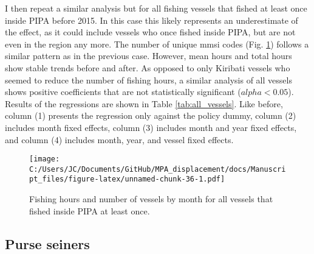 \documentclass[]{article}
\theoremstyle{definition}
\theoremstyle{definition}
\theoremstyle{definition}
\theoremstyle{remark}
\begin{document}
\clearpage

I then repeat a similar analysis but for all fishing vessels that fished
at least once inside PIPA before 2015. In this case this likely
represents an underestimate of the effect, as it could include vessels
who once fished inside PIPA, but are not even in the region any more.
The number of unique mmsi codes (Fig. \ref{fig:all_vessels}) follows a
similar pattern as in the previous case. However, mean hours and total
hours show stable trends before and after. As opposed to only Kiribati
vessels who seemed to reduce the number of fishing hours, a similar
analysis of all vessels shows positive coefficients that are not
statistically significant (\(alpha < 0.05\)). Results of the regressions
are shown in Table \ref{tab:all_vessels}. Like before, column (1)
presents the regression only against the policy dummy, column (2)
includes month fixed effects, column (3) includes month and year fixed
effects, and column (4) includes month, year, and vessel fixed effects.

\begin{figure}
\centering
\texttt{[image: C:/Users/JC/Documents/GitHub/MPA\_displacement/docs/Manuscript\_files/figure-latex/unnamed-chunk-36-1.pdf]}
\caption{\label{fig:unnamed-chunk-36}\label{fig:all_vessels}Fishing hours
and number of vessels by month for all vessels that fished inside PIPA
at least once.}
\end{figure}

\subsection{Purse seiners}\label{purse-seiners}
\end{document}
